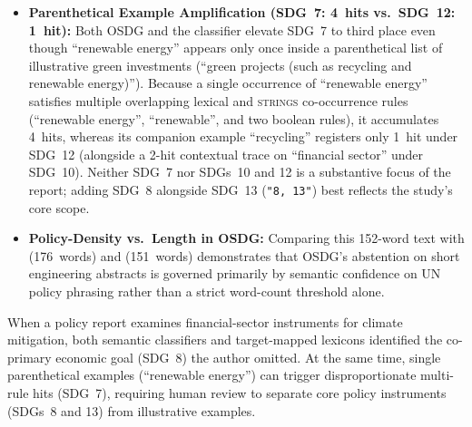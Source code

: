 \begin{casestudySection}
\begin{itemize}
    \item \textbf{Parenthetical Example Amplification (\gls{SDG}~7: \num{4}~hits vs.\ \gls{SDG}~12: \num{1}~hit):} Both OSDG and the classifier elevate \gls{SDG}~7 to third place even though \enquote{renewable energy} appears only once inside a parenthetical list of illustrative green investments (\enquote{green projects (such as recycling and renewable energy)}). Because a single occurrence of \enquote{renewable energy} satisfies multiple overlapping lexical and \textsc{strings} co-occurrence rules (\enquote{renewable energy}, \enquote{renewable}, and two boolean rules), it accumulates \num{4}~hits, whereas its companion example \enquote{recycling} registers only \num{1}~hit under \gls{SDG}~12 (alongside a \num{2}-hit contextual trace on \enquote{financial sector} under \gls{SDG}~10). Neither \gls{SDG}~7 nor \glspl{SDG}~10 and 12 is a substantive focus of the report; adding \gls{SDG}~8 alongside \gls{SDG}~13 (\texttt{"8, 13"}) best reflects the study's core scope.
    
    \item \textbf{Policy-Density vs.\ Length in OSDG:} Comparing this \num{152}-word text with  (\num{176}~words) and  (\num{151}~words) demonstrates that OSDG's abstention on short engineering abstracts is governed primarily by semantic confidence on \gls{UN} policy phrasing rather than a strict word-count threshold alone.
\end{itemize}
\end{casestudySection}

\begin{takeaway}
When a policy report examines financial-sector instruments for climate mitigation, both semantic classifiers and target-mapped lexicons identified the co-primary economic goal (\gls{SDG}~8) the author omitted. At the same time, single parenthetical examples (\eg \enquote{renewable energy}) can trigger disproportionate multi-rule hits (\gls{SDG}~7), requiring human review to separate core policy instruments (\glspl{SDG}~8 and 13) from illustrative examples.
\end{takeaway}

